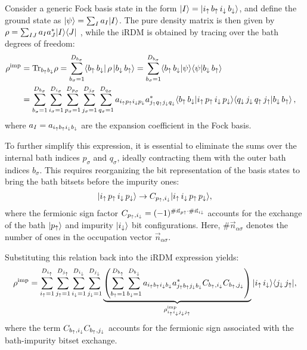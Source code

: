 \documentclass[edipack_sp.tex]{subfiles}
\begin{document}
Consider a generic Fock basis state in the form 
$|I\rangle =|{i}_\uparrow\,{b}_\uparrow\,{i}_\downarrow\,{b}_\downarrow\rangle$, and define the 
ground state as $|\psi\rangle = \sum_I a_I |I\rangle$. 
The pure density 
matrix is then given by
$\rho = \sum_{IJ} a_I a^*_J |I\rangle\langle J|$ ,
while the iRDM is obtained by tracing over the bath degrees of 
freedom:
\begin{equation}
  \begin{aligned}
    \rho^\mathrm{imp} &= \Tr_{b_\up b_\dw}{\rho} =
    \sum_{b_\sigma=1}^{D_{b_\sigma}}
    \bra{b_\up\, b_\dw}
    \,\rho\,
    \ket{b_\dw\, b_\up} =
    \sum_{b_\sigma=1}^{D_{b_\sigma}}
    \ibra{b_\up\, b_\dw}
    \ket{\psi}\ibra{\psi}
    \ket{b_\dw\, b_\up}    \cr
    &=
    \sum_{b_\sigma=1}^{D_{b_\sigma}}
    \sum_{i_\sigma=1}^{D_{i_\sigma}}
    \sum_{p_\sigma=1}^{D_{p_\sigma}}
    \sum_{j_\sigma=1}^{D_{j_\sigma}} 
    \sum_{q_\sigma=1}^{D_{q_\sigma}}
    a_{i_\up p_\up i_\dw p_\dw} a^*_{j_\up q_\up j_\dw q_\dw}%
    \langle{b_\up\, b_\dw}|{i_\up\, p_\up\, i_\dw\, p_\dw}\rangle
    \langle{q_\dw \,  j_\dw \, q_\up\, j_\up }|{b_\dw\, b_\up}\rangle\, ,
  \end{aligned}
\end{equation}
where $a_I = a_{i_\uparrow b_\uparrow i_\downarrow b_\downarrow}$ are the expansion
coefficient in the Fock basis.

To further simplify this expression, it is essential to eliminate the 
sums over the internal bath indices $p_\sigma$ and $q_\sigma$, ideally 
contracting them with the outer bath indices $b_\sigma$. This requires 
reorganizing the bit representation of the basis states to bring the 
bath bitsets before the impurity ones:
$$
|i_\uparrow\, p_\uparrow\, i_\downarrow\, p_\downarrow\rangle \rightarrow C_{p_\uparrow,i_\downarrow} |i_\uparrow\, i_\downarrow \,p_\uparrow\,p_\downarrow\rangle,
$$
where the fermionic sign factor
$C_{p_\uparrow,i_\downarrow}  = (-1)^{\#\vec{n}_{p\uparrow} \cdot
  \#\vec{n}_{i\downarrow}}$
accounts for the exchange of the bath $|p_\uparrow\rangle$  and impurity
$|i_\downarrow\rangle$ bit configurations.
Here, $\#\vec{n}_{\alpha\sigma}$ denotes the number of ones in the 
occupation vector $\vec{n}_{\alpha\sigma}$. 

Substituting this relation back into the iRDM expression yields:
\begin{equation}
    \rho^\mathrm{imp} =
    \sum_{i_\uparrow=1}^{D_{i_\uparrow}}
    \sum_{j_\uparrow=1}^{D_{j_\uparrow}}
    \sum_{i_\downarrow=1}^{D_{i_\downarrow}}
    \sum_{j_\downarrow=1}^{D_{j_\downarrow}}
    \underbrace{\left(
    \sum_{b_\uparrow=1}^{D_{b_\uparrow}}
    \sum_{b_\downarrow=1}^{D_{b_\downarrow}}
    a_{i_\uparrow b_\uparrow i_\downarrow b_\downarrow} a^*_{j_\uparrow b_\uparrow j_\downarrow b_\downarrow}
    C_{b_\uparrow,i_\downarrow}C_{b_\uparrow,j_\downarrow}\right)}_{
    \rho^\mathrm{imp}_{i_\uparrow i_\downarrow j_\downarrow j_\uparrow}}
    |i_\uparrow\, i_\downarrow\rangle\langle j_\downarrow \, j_\uparrow|,
  \end{equation}
where the term 
$C_{b_\uparrow,i_\downarrow}C_{b_\uparrow,j_\downarrow}$ accounts for the fermionic 
sign associated with the bath-impurity bitset exchange.
\end{document}
